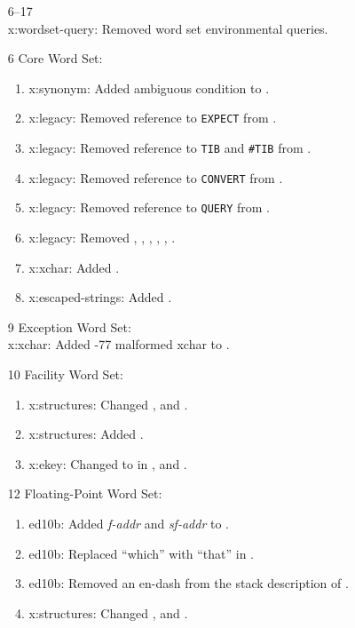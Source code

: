 \begin{itemize}
	\item[6--17] ~\\
		\textsf{x:wordset-query}: Removed word set environmental queries.

	\item[6] Core Word Set:
		\begin{enumerate}
		\item \textsf{x:synonym}: Added ambiguous condition to .
		\item \textsf{x:legacy}: Removed reference to \texttt{EXPECT} from
			.
		\item \textsf{x:legacy}: Removed reference to \texttt{TIB} and
			\texttt{\#TIB} from .
		\item \textsf{x:legacy}: Removed reference to \texttt{CONVERT} from
			.
		\item \textsf{x:legacy}: Removed reference to \texttt{QUERY} from
			.
		\item \textsf{x:legacy}: Removed ,
			,
			,
			,
			,
			.
		\item \textsf{x:xchar}: Added .
		\item \textsf{x:escaped-strings}: Added .
		\end{enumerate}

	\item[9] Exception Word Set: \\
		\textsf{x:xchar}: Added -77 malformed xchar to .

	\item[10] Facility Word Set:
		\begin{enumerate}
		\item \textsf{x:structures}: Changed ,
			and .
		\item \textsf{x:structures}: Added .
		\item \textsf{x:ekey}: Changed  to  in
			,
			 and \linebreak
			.
		\end{enumerate}

	\item[12] Floating-Point Word Set:
		\begin{enumerate}
		\item \textsf{ed10b}: Added \emph{f-addr} and \emph{sf-addr} to
			.
		\item \textsf{ed10b}: Replaced ``which'' with ``that'' in
			.
		\item \textsf{ed10b}: Removed an en-dash from the stack description of
			.
		\item \textsf{x:structures}: Changed ,
			 and
			.
		\end{enumerate}


\end{itemize}
